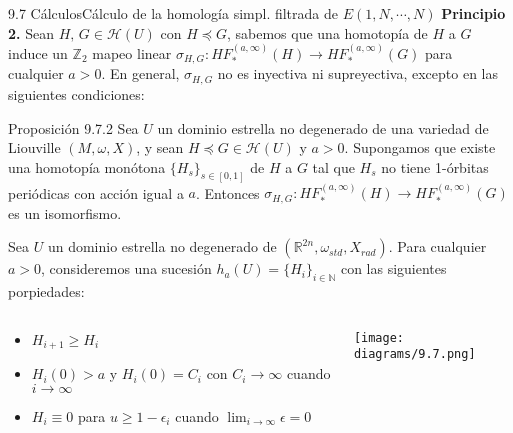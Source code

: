 \documentclass{beamer}
\begin{document}
\begin{frame}{9.7 C\'alculos}{C\'alculo de la homolog\'ia simpl. filtrada de $ E(1,N,\cdots,N)$}
{\bfseries Principio 2.} Sean $H,\,G\in \mathcal{H}(U)$ con $H\preceq G$, sabemos que una homotop\'ia de $H$ a $G$ induce un $\mathbb{Z}_2$ mapeo linear $\sigma_{H,G}:HF_{\ast}^{(a,\infty)}(H)\rightarrow HF_{\ast}^{(a,\infty)}(G)$ para cualquier $a>0$. En general, $\sigma_{H,G}$ no es inyectiva ni supreyectiva, excepto en las siguientes condiciones:\\
\vspace{1em}
\begin{block}{Proposici\'on 9.7.2}
Sea $U$ un dominio estrella no degenerado de una variedad de Liouville $(M,\omega, X)$, y sean $H\preceq G \in \mathcal{H}(U)$ y $a>0$. Supongamos que existe una homotop\'ia mon\'otona $\{H_{s}\}_{s\in [0,1]}$ de $H$ a $G$ tal que $H_{s}$ no tiene 1-\'orbitas peri\'odicas con acci\'on igual a $a$. Entonces $\sigma_{H,G}:HF_{\ast}^{(a,\infty)}(H)\rightarrow HF_{\ast}^{(a,\infty)}(G)$ es un isomorfismo.
\end{block}
\end{frame}


\begin{frame}{}
Sea $U$ un dominio estrella no degenerado de $(\mathbb{R}^{2n},\omega_{std},X_{rad})$. Para cualquier $a>0$, consideremos una sucesi\'on $h_{a}(U)=\{H_{i}\}_{i\in \mathbb{N}}$ con las siguientes porpiedades:\\
\begin{columns}
\begin{column}{0.5\textwidth}
   \begin{itemize}
   \item $H_{i+1}\geq H_{i}$
   \item $H_{i}(0)>a$ y $H_{i}(0)=C_{i}$ con $C_{i}\rightarrow \infty$ cuando $i\rightarrow \infty$
   \item $H_{i} \equiv 0$ para $u\geq 1-\epsilon_{i}$ cuando $\lim_{i\rightarrow \infty}\epsilon = 0$
   \end{itemize}
\end{column}
\begin{column}{0.5\textwidth}  %
    \begin{center}
     \texttt{[image: diagrams/9.7.png]}
     \end{center}
\end{column}
\end{columns}
\end{frame}
\end{document}
